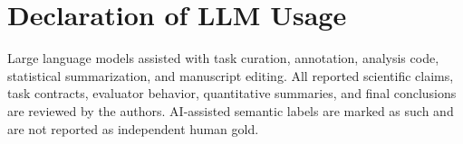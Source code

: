 \documentclass[acmsmall,anonymous,review,screen]{acmart}
\begin{document}
\section{Declaration of LLM Usage}
\label{app:llm}

Large language models assisted with task curation, annotation, analysis code,
statistical summarization, and manuscript editing. All reported scientific
claims, task contracts, evaluator behavior, quantitative summaries, and final
conclusions are reviewed by the authors. AI-assisted semantic labels are marked
as such and are not reported as independent human gold.
\end{document}
